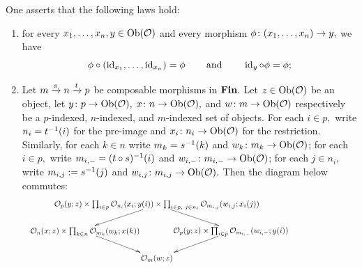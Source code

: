 \documentclass[../main/CT4S-EN-RU]{subfiles}
\begin{document}
\begin{definitionENG}
One asserts that the following laws hold:
\begin{enumerate}[\hsp 1.]
\item for every $x_1,\ldots,x_n,y\in\operatorname{Ob}(\mathcal{O})$ and every morphism $\phi\colon(x_1,\ldots,x_n)\rightarrow y,$ we have
$$\phi\circ(\operatorname{id}_{x_1},\ldots,\operatorname{id}_{x_n})=\phi\hspace{.3in}\textnormal{and}\hspace{.3in}\operatorname{id}_y\circ\phi=\phi;$$
\item Let $m\xrightarrow{s}n\xrightarrow{t}p$ be composable morphisms in ${\mathbf{Fin}}.$ Let $z\in\operatorname{Ob}(\mathcal{O})$ be an object, let $y\colon p\rightarrow\operatorname{Ob}(\mathcal{O}),$ $x\colon n\rightarrow\operatorname{Ob}(\mathcal{O}),$ and $w\colon m\rightarrow\operatorname{Ob}(\mathcal{O})$ respectively be a $p$-indexed, $n$-indexed, and $m$-indexed set of objects. For each $i\in p,$ write $n_i=t^\m1(i)$ for the pre-image and $x_i\colon n_i\rightarrow\operatorname{Ob}(\mathcal{O})$ for the restriction. Similarly, for each $k\in n$ write $m_k=s^\m1(k)$ and $w_k\colon m_k\rightarrow\operatorname{Ob}(\mathcal{O})$; for each $i\in p,$ write $m_{i,-}=(t\circ s)^\m1(i)$ and $w_{i,-}\colon m_{i,-}\rightarrow\operatorname{Ob}(\mathcal{O})$; for each $j\in n_i,$ write $m_{i,j}:=s^\m1(j)$ and $w_{i,j}\colon m_{i,j}\rightarrow\operatorname{Ob}(\mathcal{O}).$ Then the diagram below commutes:
$$\hspace{-1.4in}\xymatrix@=18pt{
&
{\hspace{.9in}\color{white}\prod\color{black}}
\save[]+<0cm,0cm>*\txt<30pc>{$
\mcO_p(y;z)\times\prod_{i\in p}\mcO_{n_i}(x_i;y(i))\times\prod_{i\in p,\ j\in n_i}\mcO_{m_{i,j}}(w_{i,j};x_i(j))
$}
\ar[rd]\ar[ld]
\restore\\
{\hspace{1in}\color{white}\prod\color{black}}
\save[]+<.4cm,0cm>*\txt<30pc>{$
\mcO_n(x;z)\times\prod_{k\in n}\mcO_{m_k}(w_k;x(k))
$}
\ar[dr]
\restore&&
{\hspace{1in}\color{white}\prod\color{black}}
\save[]+<-.3cm,0cm>*\txt<30pc>{$
\mcO_p(y;z)\times\prod_{i\in p}\mcO_{m_{i,-}}(w_{i,-};y(i))
$}
\ar[dl]
\restore\\
&\mcO_m(w;z)
}
$$
\end{enumerate}
\end{definitionENG}

\begin{definitionRUS}\label{def:operad}
\end{definitionRUS}
\end{document}
